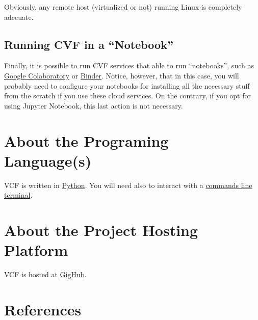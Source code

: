Obviously, any remote host (virtualized or not) running Linux is
completely adecuate.

\subsection{Running CVF in a ``Notebook''}
Finally, it is possible to run CVF services that able to run
``notebooks'', such as
\href{https://colab.research.google.com/}{Google Colaboratory} or
\href{https://mybinder.org/}{Binder}. Notice, however, that in this
case, you will probably need to configure your notebooks for
installing all the necessary stuff from the scratch if you use these
cloud services. On the contrary, if you opt for using Jupyter
Notebook, this last action is not necessary.

\section{About the Programing Language(s)}

VCF is written in \href{https://mybinder.org/}{Python}. You will need
also to interact with
a \href{https://en.wikipedia.org/wiki/Command-line_interface}{commands
line terminal}.

\section{About the Project Hosting Platform}

VCF is hosted at \href{https://github.com/}{GigHub}.

\section{References}

\renewcommand{\addcontentsline}[3]{}%

